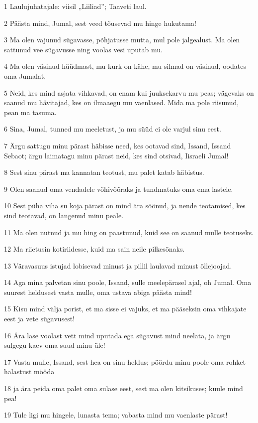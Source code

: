 \par 1 Laulujuhatajale: viisil „Liiliad”; Taaveti laul.
\par 2 Päästa mind, Jumal, sest veed tõusevad mu hinge hukutama!
\par 3 Ma olen vajunud sügavasse, põhjatusse mutta, mul pole jalgealust. Ma olen sattunud vee sügavusse ning voolas vesi uputab mu.
\par 4 Ma olen väsinud hüüdmast, mu kurk on kähe, mu silmad on väsinud, oodates oma Jumalat.
\par 5 Neid, kes mind asjata vihkavad, on enam kui juuksekarvu mu peas; vägevaks on saanud mu hävitajad, kes on ilmaaegu mu vaenlased. Mida ma pole riisunud, pean ma tasuma.
\par 6 Sina, Jumal, tunned mu meeletust, ja mu süüd ei ole varjul sinu eest.
\par 7 Ärgu sattugu minu pärast häbisse need, kes ootavad sind, Issand, Issand Sebaot; ärgu laimatagu minu pärast neid, kes sind otsivad, Iisraeli Jumal!
\par 8 Sest sinu pärast ma kannatan teotust, mu palet katab häbistus.
\par 9 Olen saanud oma vendadele võhivõõraks ja tundmatuks oma ema lastele.
\par 10 Sest püha viha su koja pärast on mind ära söönud, ja nende teotamised, kes sind teotavad, on langenud minu peale.
\par 11 Ma olen nutnud ja mu hing on paastunud, kuid see on saanud mulle teotuseks.
\par 12 Ma riietusin kotiriidesse, kuid ma sain neile pilkesõnaks.
\par 13 Väravasuus istujad lobisevad minust ja pillil laulavad minust õllejoojad.
\par 14 Aga mina palvetan sinu poole, Issand, sulle meelepärasel ajal, oh Jumal. Oma suurest heldusest vasta mulle, oma ustava abiga päästa mind!
\par 15 Kisu mind välja porist, et ma sisse ei vajuks, et ma pääseksin oma vihkajate eest ja vete sügavusest!
\par 16 Ära lase voolast vett mind uputada ega sügavust mind neelata, ja ärgu sulgegu kaev oma suud minu üle!
\par 17 Vasta mulle, Issand, sest hea on sinu heldus; pöördu minu poole oma rohket halastust mööda
\par 18 ja ära peida oma palet oma sulase eest, sest ma olen kitsikuses; kuule mind pea!
\par 19 Tule ligi mu hingele, lunasta tema; vabasta mind mu vaenlaste pärast!
